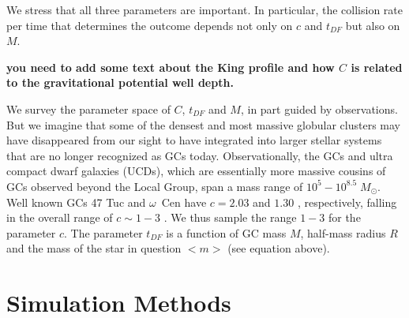 \documentclass[preprint1]{aastex}
\newcommand\msun{\; M_\odot}
\numberwithin{equation}{section}
\begin{document}
We stress that all three parameters are important. In particular,
the collision rate per time that determines the outcome 
depends not only on $c$ and $t_{DF}$ but also on $M$.

{\bf you need to add some text about the King profile and how $C$ is related to the gravitational potential well depth.}
 
We survey the parameter space of $C$, $t_{DF}$ and $M$, in part guided by observations.
But we imagine that some of the densest and most massive globular clusters may have disappeared from 
our sight to have integrated into larger stellar systems that are no longer recognized as GCs today.
Observationally, the GCs and ultra compact dwarf galaxies (UCDs), which are essentially more massive cousins
of GCs observed beyond the Local Group, span a mass range of $10^5-10^{8.5}\msun$.  
Well known GCs 47 Tuc and $\omega$~Cen have $c=2.03$ and $1.30$ \citep[][]{2000Carraro}, respectively,
falling in the overall range of $c\sim 1-3$ \citep[e.g.,][]{2007Evstigneeva}.
We thus sample the range $1-3$ for the parameter $c$.
The parameter $t_{DF}$ is a function of GC mass $M$, half-mass radius $R$ and the mass of the star in question $<m>$
(see equation above).






\section{Simulation Methods} \label{Methods}
\end{document}
